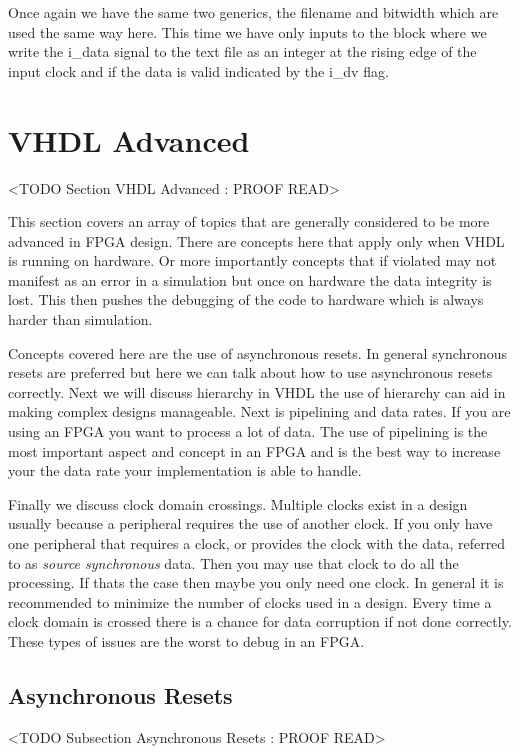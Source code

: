 Once again we have the same two generics, the filename and bitwidth which are used the same way here. This time we have only inputs to the block where we write the i\_data signal to the text file as an integer at the rising edge of the input clock and if the data is valid indicated by the i\_dv flag. 
	
\section{VHDL Advanced}
	<TODO Section VHDL Advanced : PROOF READ>

This section covers an array of topics that are generally considered to be more advanced in \ac{FPGA} design. There are concepts here that apply only when \ac{VHDL} is running on hardware. Or more importantly concepts that if violated may not manifest as an error in a simulation but once on hardware the data integrity is lost. This then pushes the debugging of the code to hardware which is always harder than simulation. 

Concepts covered here are the use of asynchronous resets. In general synchronous resets are preferred but here we can talk about how to use asynchronous resets correctly. Next we will discuss hierarchy in \ac{VHDL} the use of hierarchy can aid in making complex designs manageable. Next is pipelining and data rates. If you are using an \ac{FPGA} you want to process a lot of data. The use of pipelining is the most important aspect and concept in an \ac{FPGA} and is the best way to increase your the data rate your implementation is able to handle. 

Finally we discuss clock domain crossings. Multiple clocks exist in a design usually because a peripheral requires the use of another clock. If you only have one peripheral that requires a clock, or provides the clock with the data, referred to as \emph{source synchronous} data. Then you may use that clock to do all the processing. If thats the case then maybe you only need one clock. In general it is recommended to minimize the number of clocks used in a design. Every time a clock domain is crossed there is a chance for data corruption if not done correctly. These types of issues are the worst to debug in an \ac{FPGA}. 
	
\subsection{Asynchronous Resets}
	<TODO Subsection Asynchronous Resets : PROOF READ>
	
